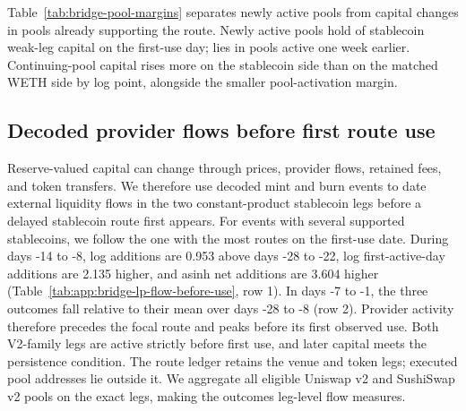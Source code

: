 Table~\ref{tab:bridge-pool-margins} separates newly active pools from capital changes in pools already supporting the route. Newly active pools hold \BridgePoolMarginNewCapitalShare{} of stablecoin weak-leg capital on the first-use day; \BridgePoolMarginContinuingCapitalShare{} lies in pools active one week earlier. Continuing-pool capital rises more on the stablecoin side than on the matched WETH side by \BridgePoolMarginContinuingDifference{} log point, alongside the smaller pool-activation margin.

\begin{table}[htbp]
\caption{Pool activation and capital growth before stablecoin route use}
\label{tab:bridge-pool-margins}
\centering
\small
\renewcommand{\arraystretch}{1.08}

\end{table}

\subsection{Decoded provider flows before first route use}

Reserve-valued capital can change through prices, provider flows, retained fees, and token transfers. We therefore use decoded mint and burn events to date external liquidity flows in the two constant-product stablecoin legs before a delayed stablecoin route first appears. For events with several supported stablecoins, we follow the one with the most routes on the first-use date. During days -14 to -8, log additions are 0.953 above days -28 to -22, log first-active-day additions are 2.135 higher, and asinh net additions are 3.604 higher (Table~\ref{tab:app:bridge-lp-flow-before-use}, row 1). In days -7 to -1, the three outcomes fall relative to their mean over days -28 to -8 (row 2). Provider activity therefore precedes the focal route and peaks before its first observed use. Both V2-family legs are active strictly before first use, and later capital meets the persistence condition. The route ledger retains the venue and token legs; executed pool addresses lie outside it. We aggregate all eligible Uniswap v2 and SushiSwap v2 pools on the exact legs, making the outcomes leg-level flow measures.

